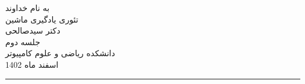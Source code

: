 \begin{minipage}{0.1\textwidth}

\end{minipage}%
\hfill%
\begin{minipage}{0.6\textwidth}\centering
\fontsize{10pt}{10pt}\selectfont
به نام خداوند \\
تئوری یادگیری ماشین \\
دکتر سیدصالحی\\
جلسه دوم
 \\
\vspace{0.25cm}
\begingroup
\fontsize{8pt}{8pt}\selectfont
دانشکده ریاضی و علوم کامپیوتر \\
اسفند ماه 1402\\
\endgroup
\end{minipage}%
\hfill%
\begin{minipage}{0.1\textwidth}
\end{minipage}

\vspace{0.5cm}

\noindent\rule{\textwidth}{1pt}